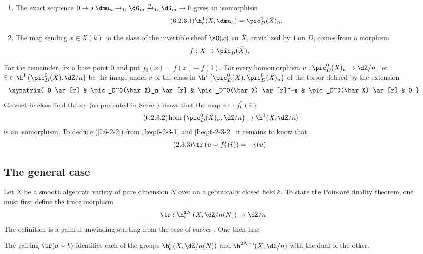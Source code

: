 \documentclass[oneside]{book}
\begin{document}
\begin{enumerate}[\indent a)]
  \item The exact sequence
    $0\to j_!\dmu_n\to_D\dG_m\xrightarrow{n}_D\dG_m\to0$ gives an
    isomorphism
    \begin{equation*}\tag{6.2.3.1}\label{I:eq:6-2-3-1}
      \h_c^1(X,\dmu_n) = \pic_D^0(\bar X)_n \text{.}
    \end{equation*}
  \item The map sending $x\in X(k)$ to the class of the invertible sheaf
    $\sO(x)$ on $\bar X$, trivialized by $1$ on $D$, comes from a
    morphism
    \[
      f:X \to \pic_D(\bar X) \text{.}
    \]
\end{enumerate}
For the remainder, fix a base point $0$ and put
$f_0(x)=f(x)-f(0)$. For every homomorphism
$v:\pic_D^0(\bar X)_n\to\dZ/n$, let
$\bar v\in\h^1\left(\pic_D^0(\bar X),\dZ/n\right)$ be the image under
$v$ of the class in
$\h^1\left(\pic_D^0(\bar X),\pic_D^0(\bar X)_n\right)$ of the torsor
defined by the extension
\[\xymatrix{
  0 \ar[r]
    & \pic_D^0(\bar X)_n \ar[r]
    & \pic_D^0(\bar X) \ar[r]^-n
    & \pic_D^0(\bar X) \ar[r]
    & 0
}\]
Geometric class field theory (as presented in Serre \cite{se59}) shows
that the map $v\mapsto f_0^*(\bar v)$
\begin{equation*}\tag{6.2.3.2}\label{I:eq:6-2-3-2}
  \hom\left(\pic_D^0(\bar X)_n,\dZ/n\right) \to \h^1(X,\dZ/n)
\end{equation*}
is an isomorphism. To deduce (\ref{I:6-2-2}) from
\eqref{I:eq:6-2-3-1} and \eqref{I:eq:6-2-3-2}, it remains to know that
\begin{equation*}\tag{2.3.3}\label{I:eq:6-2-3-3}
  \tr\left(u \smallsmile f_0^*(\bar v)\right) = -v(u) \text{.}
\end{equation*}


\subsection{The general case}\label{I:6-3}

Let $X$ be a smooth algebraic variety of pure dimension $N$ over an
algebraically closed field $k$. To state the Poincaré duality theorem,
one must first define the trace morphism
\[
  \tr : \h_c^{2N}\left(X,\dZ/n(N)\right) \to \dZ/n\text{.}
\]
The definition is a painful unwinding starting from the case of curves
\cite[XVIII \S 2]{sga4}. One then has:

\begin{theorem}\label{I:6-3-1}
The pairing $\tr(a\smallsmile b)$ identifies each of the groups
$\h_c^i\left(X,\dZ/n(N)\right)$ and $\h^{2N-i}(X,\dZ/n)$ with the dual
of the other.
\end{theorem}
\end{document}
